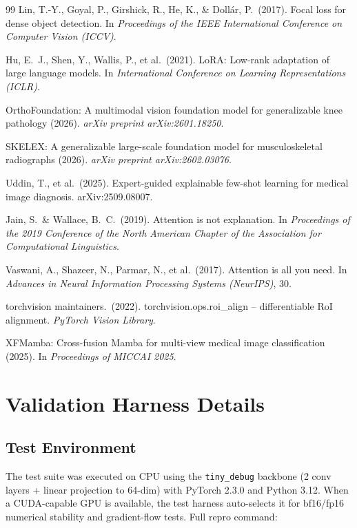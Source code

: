 \documentclass{article}
\begin{document}
{\begin{thebibliography}{99}
  Lin, T.-Y., Goyal, P., Girshick, R., He, K., \& Dollár, P.\ (2017).
  Focal loss for dense object detection.
  In {\it Proceedings of the IEEE International Conference on Computer Vision (ICCV)}.

  Hu, E.\ J., Shen, Y., Wallis, P., et al.\ (2021).
  LoRA: Low-rank adaptation of large language models.
  In {\it International Conference on Learning Representations (ICLR)}.

  OrthoFoundation: A multimodal vision foundation model for generalizable knee pathology (2026).
  {\it arXiv preprint arXiv:2601.18250}.

  SKELEX: A generalizable large-scale foundation model for musculoskeletal radiographs (2026).
  {\it arXiv preprint arXiv:2602.03076}.

  Uddin, T., et al.\ (2025).
  Expert-guided explainable few-shot learning for medical image diagnosis.
  arXiv:2509.08007.

  Jain, S.\ \& Wallace, B.\ C.\ (2019).
  Attention is not explanation.
  In {\it Proceedings of the 2019 Conference of the North American Chapter of the Association for Computational Linguistics}.

  Vaswani, A., Shazeer, N., Parmar, N., et al.\ (2017).
  Attention is all you need.
  In {\it Advances in Neural Information Processing Systems (NeurIPS)}, 30.

  torchvision maintainers.\ (2022).
  torchvision.ops.roi\_align -- differentiable RoI alignment.
  {\it PyTorch Vision Library}.

  XFMamba: Cross-fusion Mamba for multi-view medical image classification (2025).
  In {\it Proceedings of MICCAI 2025}.

\end{thebibliography}
}

\appendix
\section{Validation Harness Details}

\subsection{Test Environment}
The test suite was executed on CPU using the \texttt{tiny\_debug} backbone (2 conv layers + linear projection to 64-dim) with PyTorch 2.3.0 and Python 3.12. When a CUDA-capable GPU is available, the test harness auto-selects it for bf16/fp16 numerical stability and gradient-flow tests. Full repro command:
\end{document}
